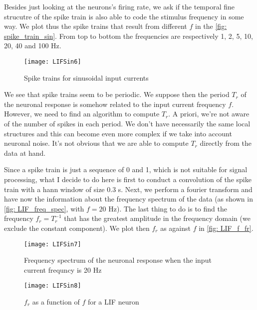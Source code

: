 Besides just looking at the neurons's firing rate, we ask if the temporal fine
strucutre of the spike train is also able to code the stimulus frequency in
some way. We plot thus the spike trains that result from different $f$ in 
the \autoref{fig: spike_train_sin}. From top to bottom the frequencies are 
respectively 1, 2, 5, 10, 20, 40 and 100 Hz.

\begin{figure}[H]
  \centering
  \texttt{[image: LIFSin6]}
  \caption{Spike trains for sinusoidal input currents}
  \label{fig: spike_train_sin}
\end{figure}

We see that spike trains seem to be periodic. We suppose then the period
$T_r$ of the neuronal response is somehow related to the input current 
frequency $f$. However, we need to find an algorithm to compute $T_r$.
A priori, we're not aware of the number of spikes in each period. 
We don't have necessarily the same local structures and this can become even 
more complex if we take into account neuronal noise. It's not obvious that 
we are able to compute $T_r$ directly from the data at hand.

Since a spike train is just a sequence of 0 and 1, which is not suitable 
for signal processing, what I decide to do here is first to conduct a 
convolution of the spike train with a hann window of size 0.3 s. 
Next, we perform a fourier transform and have now the information about 
the frequency spectrum of the data (as shown in \autoref{fig: LIF_freq_spec}, 
with $f = 20$ Hz). The last thing to do is to find the frequency 
$f_r = T_r^{-1}$ that has the greatest amplitude in the frequency domain 
(we exclude the constant component). We plot then $f_r$ as against $f$ in
\autoref{fig: LIF_f_fr}.

\vspace{-1em}
\begin{figure}[H]
  \centering
  \texttt{[image: LIFSin7]}
  \caption{Frequency spectrum of the neuronal response when 
           the input current frequncy is 20 Hz}
  \label{fig: LIF_freq_spec}
\end{figure}

\vspace{-1em}
\begin{figure}[H]
  \centering
  \texttt{[image: LIFSin8]}
  \caption{$f_r$ as a function of $f$ for a LIF neuron}
  \label{fig: LIF_f_fr}
\end{figure}

